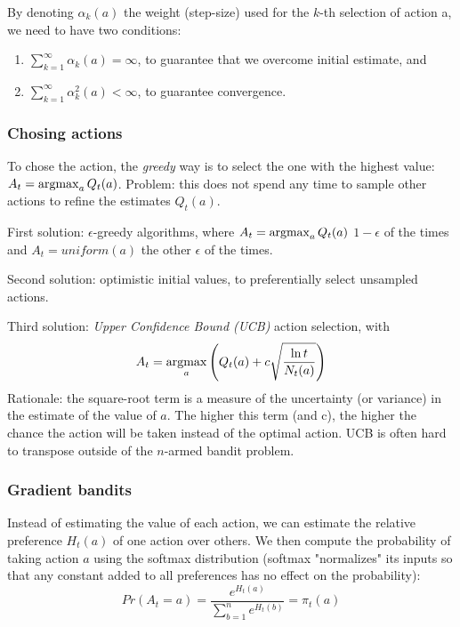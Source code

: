 By denoting $\alpha_k(a)$ the weight (step-size) used for the $k$-th selection of action a, we need to have two conditions:
\begin{enumerate}
\item $\sum_{k=1}^{\infty} \alpha_k(a) = \infty$, to guarantee that we overcome initial estimate, and
\item $\sum_{k=1}^{\infty} \alpha_k^2(a) < \infty$, to guarantee convergence.
\end{enumerate}



\subsubsection{Chosing actions}
To chose the action, the \textit{greedy} way is to select the one with the highest value: $A_t = \operatorname*{argmax}_a Q_t(a)$.
Problem: this does not spend any time to sample other actions to refine the estimates $Q_t(a)$.

First solution: $\epsilon$-greedy algorithms, where $A_t = \operatorname*{argmax}_a Q_t(a)$ $1 - \epsilon$ of the times and $A_t = uniform(a)$ the other $\epsilon$ of the times.

Second solution: optimistic initial values, to preferentially select unsampled actions.

Third solution: \textit{Upper Confidence Bound (UCB)} action selection, with
\[
A_t = \operatorname*{argmax}_a \left( Q_t(a) + c \sqrt{\frac{\ln t}{N_t(a)}} \right)
\]
Rationale: the square-root term is a measure of the uncertainty (or variance) in the estimate of the value of $a$.
The higher this term (and c), the higher the chance the action will be taken instead of the optimal action.
UCB is often hard to transpose outside of the $n$-armed bandit problem.

\subsubsection{Gradient bandits}
Instead of estimating the value of each action, we can estimate the relative preference $H_t(a)$ of one action over others.
We then compute the probability of taking action $a$ using the softmax distribution (softmax "normalizes" its inputs so that any constant added to all preferences has no effect on the probability):
\[
Pr(A_t = a) = \frac{e^{H_t(a)}}{\sum_{b=1}^{n} e^{H_t(b)}} = \pi_t(a)
\]

